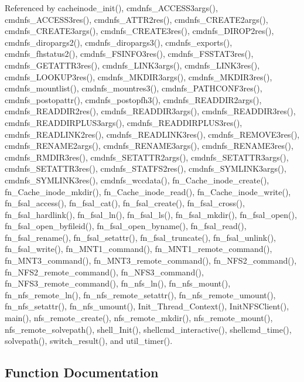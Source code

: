 Referenced by cacheinode\_\-init(), cmdnfs\_\-ACCESS3args(), cmdnfs\_\-ACCESS3res(), cmdnfs\_\-ATTR2res(), cmdnfs\_\-CREATE2args(), cmdnfs\_\-CREATE3args(), cmdnfs\_\-CREATE3res(), cmdnfs\_\-DIROP2res(), cmdnfs\_\-diropargs2(), cmdnfs\_\-diropargs3(), cmdnfs\_\-exports(), cmdnfs\_\-fhstatus2(), cmdnfs\_\-FSINFO3res(), cmdnfs\_\-FSSTAT3res(), cmdnfs\_\-GETATTR3res(), cmdnfs\_\-LINK3args(), cmdnfs\_\-LINK3res(), cmdnfs\_\-LOOKUP3res(), cmdnfs\_\-MKDIR3args(), cmdnfs\_\-MKDIR3res(), cmdnfs\_\-mountlist(), cmdnfs\_\-mountres3(), cmdnfs\_\-PATHCONF3res(), cmdnfs\_\-postopattr(), cmdnfs\_\-postopfh3(), cmdnfs\_\-READDIR2args(), cmdnfs\_\-READDIR2res(), cmdnfs\_\-READDIR3args(), cmdnfs\_\-READDIR3res(), cmdnfs\_\-READDIRPLUS3args(), cmdnfs\_\-READDIRPLUS3res(), cmdnfs\_\-READLINK2res(), cmdnfs\_\-READLINK3res(), cmdnfs\_\-REMOVE3res(), cmdnfs\_\-RENAME2args(), cmdnfs\_\-RENAME3args(), cmdnfs\_\-RENAME3res(), cmdnfs\_\-RMDIR3res(), cmdnfs\_\-SETATTR2args(), cmdnfs\_\-SETATTR3args(), cmdnfs\_\-SETATTR3res(), cmdnfs\_\-STATFS2res(), cmdnfs\_\-SYMLINK3args(), cmdnfs\_\-SYMLINK3res(), cmdnfs\_\-wccdata(), fn\_\-Cache\_\-inode\_\-create(), fn\_\-Cache\_\-inode\_\-mkdir(), fn\_\-Cache\_\-inode\_\-read(), fn\_\-Cache\_\-inode\_\-write(), fn\_\-fsal\_\-access(), fn\_\-fsal\_\-cat(), fn\_\-fsal\_\-create(), fn\_\-fsal\_\-cross(), fn\_\-fsal\_\-hardlink(), fn\_\-fsal\_\-ln(), fn\_\-fsal\_\-ls(), fn\_\-fsal\_\-mkdir(), fn\_\-fsal\_\-open(), fn\_\-fsal\_\-open\_\-byfileid(), fn\_\-fsal\_\-open\_\-byname(), fn\_\-fsal\_\-read(), fn\_\-fsal\_\-rename(), fn\_\-fsal\_\-setattr(), fn\_\-fsal\_\-truncate(), fn\_\-fsal\_\-unlink(), fn\_\-fsal\_\-write(), fn\_\-MNT1\_\-command(), fn\_\-MNT1\_\-remote\_\-command(), fn\_\-MNT3\_\-command(), fn\_\-MNT3\_\-remote\_\-command(), fn\_\-NFS2\_\-command(), fn\_\-NFS2\_\-remote\_\-command(), fn\_\-NFS3\_\-command(), fn\_\-NFS3\_\-remote\_\-command(), fn\_\-nfs\_\-ln(), fn\_\-nfs\_\-mount(), fn\_\-nfs\_\-remote\_\-ln(), fn\_\-nfs\_\-remote\_\-setattr(), fn\_\-nfs\_\-remote\_\-umount(), fn\_\-nfs\_\-setattr(), fn\_\-nfs\_\-umount(), Init\_\-Thread\_\-Context(), Init\-NFSClient(), main(), nfs\_\-remote\_\-create(), nfs\_\-remote\_\-mkdir(), nfs\_\-remote\_\-mount(), nfs\_\-remote\_\-solvepath(), shell\_\-Init(), shellcmd\_\-interactive(), shellcmd\_\-time(), solvepath(), switch\_\-result(), and util\_\-timer().

\subsection{Function Documentation}
